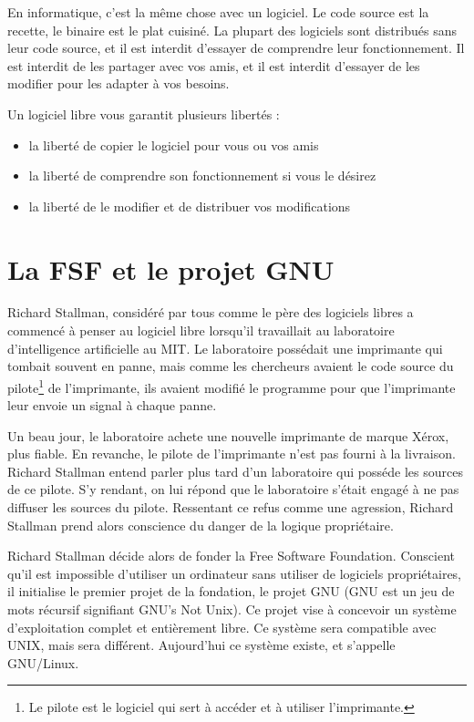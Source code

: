 \documentclass{article}
\begin{document}
En informatique, c'est la même chose avec un logiciel. Le code source est la recette, le binaire est le plat cuisiné. La plupart des logiciels sont distribués sans leur code source, et il est interdit d'essayer de comprendre leur fonctionnement. Il est interdit de les partager avec vos amis, et il est interdit d'essayer de les modifier pour les adapter à vos besoins.

Un logiciel libre vous garantit plusieurs libertés :
\begin{itemize}
    \item la liberté de copier le logiciel pour vous ou vos amis
    \item la liberté de comprendre son fonctionnement si vous le désirez
    \item la liberté de le modifier et de distribuer vos modifications
\end{itemize}

\section{La FSF et le projet GNU}

Richard Stallman, considéré par tous comme le père des logiciels libres a commencé à penser au logiciel libre lorsqu'il travaillait au laboratoire d'intelligence artificielle au MIT. Le laboratoire possédait une imprimante qui tombait souvent en panne, mais comme les chercheurs avaient le code source du pilote\footnote{Le pilote est le logiciel qui sert à accéder et à utiliser l'imprimante.} de l'imprimante, ils avaient modifié le programme pour que l'imprimante leur envoie un signal à chaque panne.

Un beau jour, le laboratoire achete une nouvelle imprimante de marque Xérox, plus fiable. En revanche, le pilote de l'imprimante n'est pas fourni à la livraison. Richard Stallman entend parler plus tard d'un laboratoire qui posséde les sources de ce pilote. S'y rendant, on lui répond que le laboratoire s'était engagé à ne pas diffuser les sources du pilote. Ressentant ce refus comme une agression, Richard Stallman prend alors conscience du danger de la logique propriétaire.

Richard Stallman décide alors de fonder la Free Software Foundation. Conscient qu'il est impossible d'utiliser un ordinateur sans utiliser de logiciels propriétaires, il initialise le premier projet de la fondation, le projet GNU (GNU est un jeu de mots récursif signifiant GNU's Not Unix). Ce projet vise à concevoir un système d'exploitation complet et entièrement libre. Ce système sera compatible avec UNIX, mais sera différent. Aujourd'hui ce système existe, et s'appelle GNU/Linux.
\end{document}
